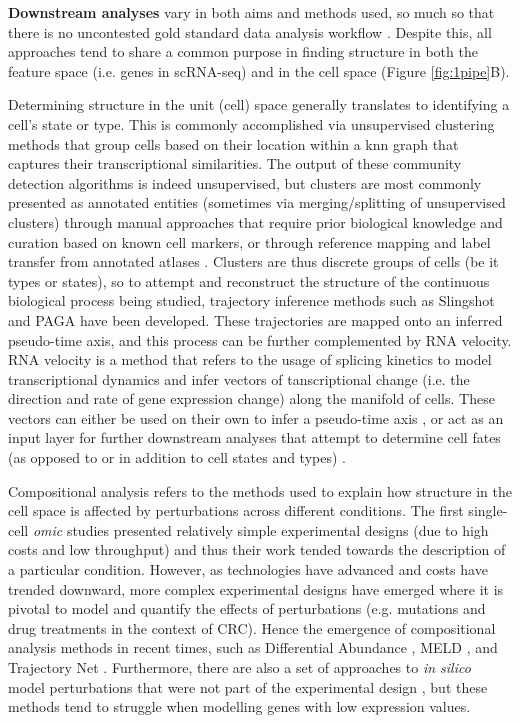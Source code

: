 \textbf{Downstream analyses} vary in both aims and methods used, so much so that there is no uncontested gold standard data analysis workflow \cite{slovin_single-cell_2021}. Despite this, all approaches tend to share a common purpose in finding structure in both the feature space (i.e. genes in scRNA-seq) and in the cell space (Figure \ref{fig:1pipe}B).

Determining structure in the unit (cell) space generally translates to identifying a cell's state or type. This is commonly accomplished via unsupervised clustering methods that group cells based on their location within a \acrfull{knn} graph that captures their transcriptional similarities. The output of these community detection algorithms \cite{blondel_fast_2008,traag_louvain_2019} is indeed unsupervised, but clusters are most commonly presented as annotated entities (sometimes via merging/splitting of unsupervised clusters) through manual approaches that require prior biological knowledge and curation based on known cell markers, or through reference mapping and label transfer from annotated atlases \cite{lotfollahi_mapping_2022}. Clusters are thus discrete groups of cells (be it types or states), so to attempt and reconstruct the structure of the continuous biological process being studied, trajectory inference methods such as Slingshot \cite{street_slingshot_2018} and PAGA \cite{wolf_paga_2019} have been developed. These trajectories are mapped onto an inferred pseudo-time axis, and this process can be further complemented by RNA velocity. RNA velocity \cite{la_manno_rna_2018} is a method that refers to the usage of splicing kinetics to model transcriptional dynamics and infer vectors of tanscriptional change (i.e. the direction and rate of gene expression change) along the manifold of cells. These vectors can either be used on their own to infer a pseudo-time axis \cite{bergen_generalizing_2020}, or act as an input layer for further downstream analyses that attempt to determine cell fates (as opposed to or in addition to cell states and types) \cite{lange_cellrank_2022}.

Compositional analysis refers to the methods used to explain how structure in the cell space is affected by perturbations across different conditions. The first single-cell \emph{omic} studies presented relatively simple experimental designs (due to high costs and low throughput) and thus their work tended towards the description of a particular condition. However, as technologies have advanced and costs have trended downward, more complex experimental designs have emerged where it is pivotal to model and quantify the effects of perturbations (e.g. mutations and drug treatments in the context of CRC). Hence the emergence of compositional analysis methods in recent times, such as Differential Abundance \cite{lun_testing_2017,dann_differential_2022}, MELD \cite{burkhardt_quantifying_2021}, and Trajectory Net \cite{tong_trajectorynet_2020}. Furthermore, there are also a set of approaches to \emph{in silico} model perturbations that were not part of the experimental design \cite{lotfollahi_scgen_2019,yuan_cellbox_2021,lotfollahi_learning_2021}, but these methods tend to struggle when modelling genes with low expression values.

